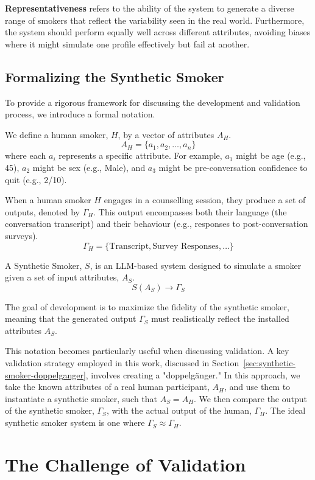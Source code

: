 \textbf{Representativeness} refers to the ability of the system to generate a diverse range of smokers that reflect the variability seen in the real world. Furthermore, the system should perform equally well across different attributes, avoiding biases where it might simulate one profile effectively but fail at another.

\subsection{Formalizing the Synthetic Smoker}
\label{sec:synthetic-smoker-notation}

To provide a rigorous framework for discussing the development and validation process, we introduce a formal notation.

We define a human smoker, $H$, by a vector of attributes $A_H$.
\[
A_H = \{a_1, a_2, \ldots, a_n\}
\]
where each $a_i$ represents a specific attribute. For example, $a_1$ might be age (e.g., 45), $a_2$ might be sex (e.g., Male), and $a_3$ might be pre-conversation confidence to quit (e.g., 2/10).

When a human smoker $H$ engages in a counselling session, they produce a set of outputs, denoted by $\Gamma_H$. This output encompasses both their language (the conversation transcript) and their behaviour (e.g., responses to post-conversation surveys).
\[
\Gamma_H = \{\text{Transcript}, \text{Survey Responses}, \ldots\}
\]

A Synthetic Smoker, $S$, is an LLM-based system designed to simulate a smoker given a set of input attributes, $A_S$.
\[
S(A_S) \rightarrow \Gamma_S
\]

The goal of development is to maximize the fidelity of the synthetic smoker, meaning that the generated output $\Gamma_S$ must realistically reflect the installed attributes $A_S$.

This notation becomes particularly useful when discussing validation. A key validation strategy employed in this work, discussed in Section~\ref{sec:synthetic-smoker-doppelganger}, involves creating a "doppelgänger." In this approach, we take the known attributes of a real human participant, $A_H$, and use them to instantiate a synthetic smoker, such that $A_S = A_H$. We then compare the output of the synthetic smoker, $\Gamma_S$, with the actual output of the human, $\Gamma_H$. The ideal synthetic smoker system is one where $\Gamma_S \approx \Gamma_H$.

\section{The Challenge of Validation}
\label{sec:synthetic-smoker-validation-challenge}

